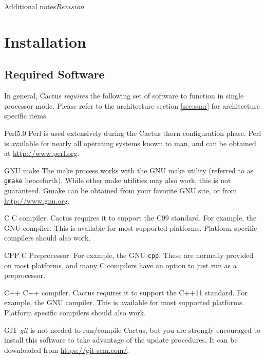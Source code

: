 
\begin{cactuspart}{Additional notes}{}{$Revision$}\label{part:Notes}
\renewcommand{\thepage}{\Alph{part}\arabic{page}}




\chapter{Installation}
\label{cha:in}


\section{Required Software}
\label{sec:required_software}

In general, Cactus \emph{requires} the following set of software to function
in single processor mode. Please refer to the architecture section
\ref{sec:suar} for architecture specific items.
\begin{Lentry}
\item[Perl5.0] Perl is used extensively during the Cactus
  thorn configuration phase. Perl is available for nearly all
  operating systems known to man, and can be obtained at
  \url{http://www.perl.org}.
\item[GNU make] The make
  process works with the GNU make utility (referred to as \texttt{gmake}
  henceforth). While other make utilities may also work, this is not
  guaranteed. Gmake can be obtained from your favorite GNU site, or
  from \url{http://www.gnu.org}.
\item[C] C compiler. Cactus requires it to support the C99 standard. For
  example, the GNU compiler. This is available for most supported platforms.
  Platform specific compilers should also work.
\item[CPP] C Preprocessor. For example, the GNU \texttt{cpp}.  These are
  normally provided on most platforms, and many C compilers have an option
  to just run as a preprocessor.
\item[C++] C++ compiler. Cactus requires it to support the C++11 standard. For
  example, the GNU compiler. This is available for most supported platforms.
  Platform specific compilers should also work.
\item[GIT] \textit{git} is not needed
  to run/compile Cactus, but you are strongly encouraged to install
  this software to take advantage of the update procedures. It can be
  downloaded from \url{https://git-scm.com/}.
\end{Lentry}


\end{cactuspart}
